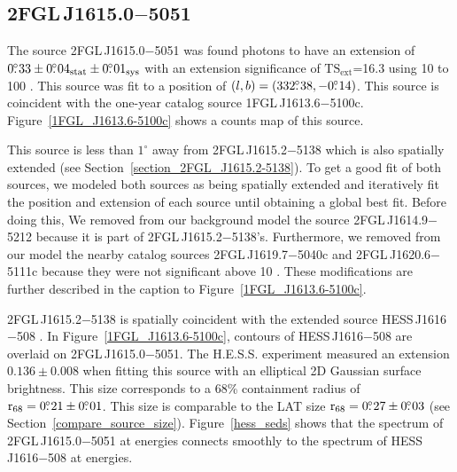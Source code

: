 \documentclass[12pt,preprint]{aastex}
\newcommand{\gev}{\text{GeV}\xspace}
\newcommand{\tev}{\text{TeV}\xspace}
\newcommand{\tsext}{{\ensuremath{\text{TS}_{\text{ext}}}}\xspace}
\newcommand{\rsixeight}{{\ensuremath{\text{r}_{68}}}\xspace}
\newcommand{\sys}{\text{sys}\xspace}
\newcommand{\stat}{\text{stat}\xspace}
\newcommand{\degree}{^\circ\xspace}
\begin{document}
\subsection{2FGL\,J1615.0$-$5051}
\label{section_2FGL_J1615.0-5051}


The source 2FGL\,J1615.0$-$5051 was found 
photons to have an extension of $0\fdg33\pm0\fdg04_\stat\pm0\fdg01_\sys$
with an extension significance of \tsext=16.3
using 10 \gev to 100 \gev.  This source
was fit to a position of $(l,b)=(332\mbox{$.\!\!^\circ$}38,-0\mbox{$.\!\!^\circ$}14)$.
This source is coincident with the one-year catalog source
1FGL\,J1613.6$-$5100c. Figure~\ref{1FGL_J1613.6-5100c} shows a counts map
of this source.

This source is less than $1\degree$ away from 2FGL\,J1615.2$-$5138 which is
also spatially extended (see Section~\ref{section_2FGL_J1615.2-5138}).
To get a good fit of both sources, we modeled both sources as
being spatially extended and iteratively fit the position and extension
of each source until obtaining a global best fit.  Before doing this,
We removed from our background model the source 2FGL\,J1614.9$-$5212 because it is
part of 2FGL\,J1615.2$-$5138's. Furthermore, we removed from our model the nearby catalog
sources 2FGL\,J1619.7$-$5040c and 2FGL\,J1620.6$-$5111c because they were not
significant above 10 \gev.  These modifications are further described
in the caption to Figure~\ref{1FGL_J1613.6-5100c}.  

2FGL\,J1615.2$-$5138 is spatially coincident with the extended
\tev source HESS\,J1616$-$508 \citep{hess_plane_survey}.  In
Figure~\ref{1FGL_J1613.6-5100c}, contours of HESS\,J1616$-$508 are overlaid
on 2FGL\,J1615.0$-$5051.  The H.E.S.S. experiment measured an
extension $0.136\pm 0.008$ when fitting this source with an elliptical
2D Gaussian surface brightness.  This size corresponds to a 68\% containment
radius of $\rsixeight=0\fdg21\pm0\fdg01$. This size is comparable to the LAT
size $\rsixeight=0\fdg27\pm0\fdg03$ (see Section~\ref{compare_source_size}).
Figure~\ref{hess_seds} shows that the spectrum of 2FGL\,J1615.0$-$5051
at \gev energies
connects smoothly to the spectrum of HESS\,J1616$-$508 at \tev
energies.
\end{document}
